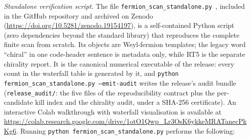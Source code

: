 \documentclass[11pt]{article}
\theoremstyle{definition}
\begin{document}
\smallskip\noindent\textit{Standalone verification script.}\quad
The file \texttt{fermion\_scan\_standalone.py}~\cite{BrookeFermionScan},
included in the GitHub repository and archived on Zenodo
(\url{https://doi.org/10.5281/zenodo.19154197}),
is a self-contained Python script (zero dependencies beyond the
standard library) that reproduces the complete finite scan from
scratch.  Its objects are Weyl-fermion templates; the legacy word
``chiral'' in one code-header sentence is metadata only, while RT5 is
the separate chirality report.  It is the canonical numerical
executable of the release: every count in the waterfall table is
generated by it, and
\texttt{python fermion\_scan\_standalone.py --emit-audit} writes the
release's audit bundle (\texttt{release\_audit/}: the five files of
the reproducibility contract plus the per-candidate kill index and
the chirality audit, under a SHA-256 certificate).  An interactive
Colab walkthrough with waterfall visualisation is available at
\url{https://colab.research.google.com/drive/1otO1Qwp_Lr3OsK6ykkeMRATanecPkKg6}.
Running \texttt{python fermion\_scan\_standalone.py} performs the following:
\end{document}
